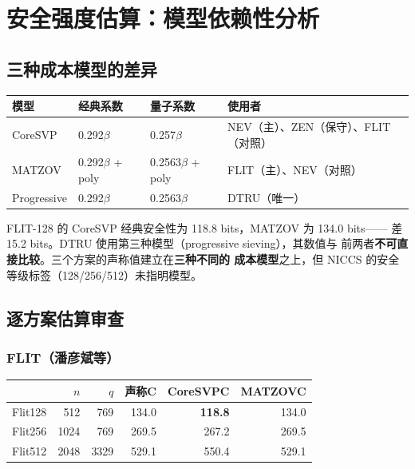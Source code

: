 \documentclass[11pt,a4paper]{ctexart}
\begin{document}
\section{安全强度估算：模型依赖性分析}

\subsection{三种成本模型的差异}

\begin{table}[htbp]\centering\small
\begin{tabular}{@{}llll@{}}
\toprule
模型 & 经典系数 & 量子系数 & 使用者 \\
\midrule
CoreSVP & 0.292$\beta$ & 0.257$\beta$ & NEV（主）、ZEN（保守）、FLIT（对照） \\
MATZOV & 0.292$\beta$ + poly & 0.2563$\beta$ + poly & FLIT（主）、NEV（对照） \\
Progressive & 0.292$\beta$ & 0.2563$\beta$ & DTRU（唯一） \\
\bottomrule
\end{tabular}
\end{table}

\begin{warnbox}
FLIT-128 的 CoreSVP 经典安全性为 118.8 bits，MATZOV 为 134.0 bits——
差 15.2 bits。DTRU 使用第三种模型（progressive sieving），其数值与
前两者\textbf{不可直接比较}。三个方案的声称值建立在\textbf{三种不同的
成本模型}之上，但 NICCS 的安全等级标签（128/256/512）未指明模型。
\end{warnbox}

\subsection{逐方案估算审查}

\subsubsection{FLIT（潘彦斌等）}

\begin{table}[htbp]\centering\small
\begin{tabular}{@{}lrrrrr@{}}
\toprule
 & $n$ & $q$ & 声称C & CoreSVPC & MATZOVC \\
\midrule
Flit128 & 512 & 769 & 134.0 & \textbf{118.8} & 134.0 \\
Flit256 & 1024 & 769 & 269.5 & 267.2 & 269.5 \\
Flit512 & 2048 & 3329 & 529.1 & 550.4 & 529.1 \\
\bottomrule
\end{tabular}
\end{table}
\end{document}
